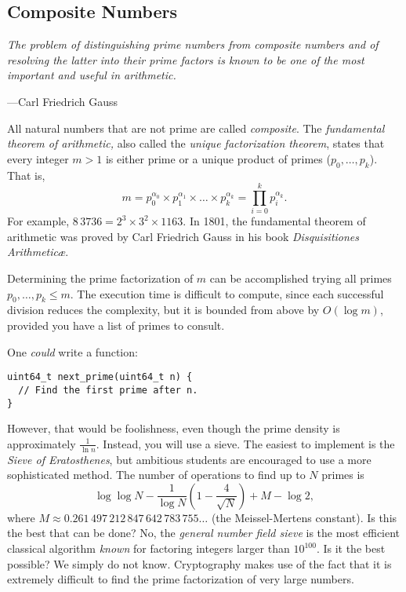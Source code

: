 \documentclass{article}
\begin{document}
\subsection{Composite Numbers}
\textwidth
\epigraph{\emph{The problem of distinguishing prime numbers from composite numbers and of resolving the latter into their prime factors is known to be one of the most important and useful in arithmetic.}}{---Carl Friedrich Gauss}

All natural numbers that are not prime are called \emph{composite}.
The \emph{fundamental theorem of arithmetic,}
also called the \emph{unique factorization theorem},
states that every integer $m>1$ is either prime or a unique
product of primes ($p_0, \ldots, p_k$).
That is,
$$
m = p_0^{\alpha_0} \times p_1^{\alpha_1} \times \ldots \times p_k^{\alpha_k}
= \prod_{i=0}^{k} p_i^{\alpha_k}.
$$
For example, $8\,3736=2^3\times 3^2\times 1163$.
In 1801, the fundamental theorem of arithmetic was proved by Carl Friedrich Gauss in his book
\emph{Disquisitiones Arithmetic\ae{}}.

Determining the prime factorization of $m$ can be accomplished trying all
primes $p_0, \ldots, p_k \le m$.
The execution time is difficult to compute, since each successful division reduces the complexity, but it is bounded from above by $O(\log m)$, provided you have a list of primes to consult.

One \emph{could} write a function:
\begin{lstlisting}
uint64_t next_prime(uint64_t n) {
  // Find the first prime after n.
}
\end{lstlisting}
However, that would be foolishness, even though the prime density is
approximately $\tfrac{1}{\ln n}$. Instead, you will use a sieve.
The easiest to implement is the \emph{Sieve of Eratosthenes}, but ambitious
students are encouraged to use a more sophisticated method. The number of operations to find up to $N$ primes is
$$
\log\log N - \frac{1}{\log N} \left ( 1 - \frac{4}{\sqrt N} \right ) + M - \log 2,
$$
where $M\approx 0.261\,497\,212\,847\,642\,783\,755\ldots$ (the Meissel-Mertens constant).
Is this the best that can be done? No, the \emph{general number
field sieve} is the most efficient classical algorithm \emph{known}
for factoring integers larger than $10^{100}$. Is it the best possible? We
simply do not know. Cryptography makes use of the fact that it is extremely
difficult to find the prime factorization of very large numbers.

\end{document}
